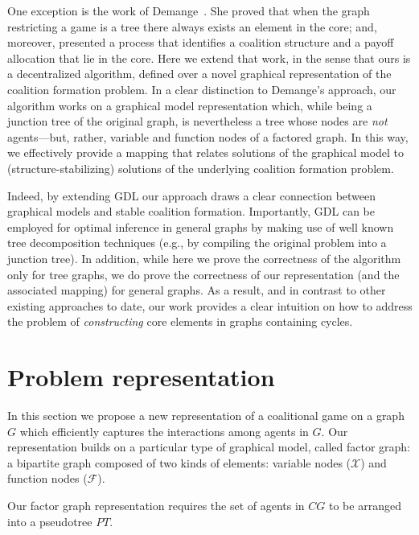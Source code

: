 \documentclass{aamas2012}
\begin{document}
One exception is the work of Demange~\cite{demange2004}. She proved that when the graph restricting a game is a tree there always exists an element in the core; and,
moreover, presented a process that identifies a coalition structure and a payoff allocation that lie in the core. %
Here we extend that work, in the sense that ours is a decentralized algorithm,
defined over a novel graphical representation of the coalition formation
problem. In a clear distinction to Demange's approach, our algorithm
works on a graphical model representation which, while being a junction tree of the original
graph, is nevertheless a tree whose nodes are {\em not} agents---but, rather, variable
and function nodes of a factored graph. In this way, we effectively provide a mapping that relates solutions of the graphical model to (structure-stabilizing) solutions of the underlying coalition formation problem.

Indeed, by extending GDL our approach draws a clear connection between graphical models and
stable coalition formation.  
Importantly, GDL can be employed for optimal inference in general graphs by
making use of well known tree decomposition techniques (e.g., by compiling the
original problem into a junction tree). In addition, while here we prove the
correctness of the algorithm only for tree graphs, we do prove the correctness of our representation (and the associated mapping) for general graphs. As a result, and in contrast to other existing approaches to date, our work provides a clear intuition on how to address the problem of {\em constructing} core elements in graphs containing cycles.



\section{Problem representation}
\label{sec:representation}

\noindent In this section we propose a new representation of a coalitional game
on a graph $G$ which efficiently captures the
interactions among agents in $G$. Our representation builds on a particular type
of graphical model, called factor graph: a bipartite graph composed of two kinds
of elements: variable nodes ($\mathcal{X}$) and function nodes ($\mathcal{F}$).

Our factor graph representation requires the set of agents in $CG$ to be
arranged into a pseudotree $PT$.

 
\end{document}
